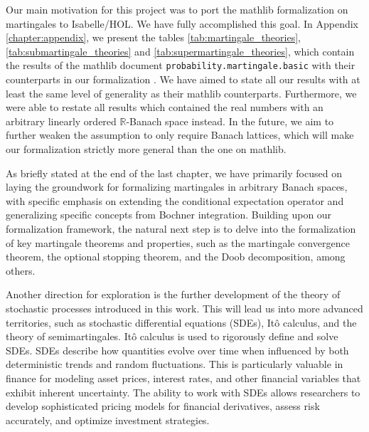 Our main motivation for this project was to port the \textsf{mathlib} formalization on martingales to Isabelle/HOL. We have fully accomplished this goal. In Appendix \ref{chapter:appendix}, we present the tables \ref{tab:martingale_theories}, \ref{tab:submartingale_theories} and \ref{tab:supermartingale_theories}, which contain the results of the \textsf{mathlib} document \texttt{probability.mar\-tingale.basic} \cite{Degenne_Ying_2022} with their counterparts in our formalization \cite{Keskin_A_Formalization_of_2023}. We have aimed to state all our results with at least the same level of generality as their \textsf{mathlib} counterparts. Furthermore, we were able to restate all results which contained the real numbers with an arbitrary linearly ordered $\mathbb{R}$-Banach space instead. In the future, we aim to further weaken the assumption to only require Banach lattices, which will make our formalization strictly more general than the one on \textsf{mathlib}.

As briefly stated at the end of the last chapter, we have primarily focused on laying the groundwork for formalizing martingales in arbitrary Banach spaces, with specific emphasis on extending the conditional expectation operator and generalizing specific concepts from Bochner integration. Building upon our formalization framework, the natural next step is to delve into the formalization of key martingale theorems and properties, such as the martingale convergence theorem, the optional stopping theorem, and the Doob decomposition, among others. 

Another direction for exploration is the further development of the theory of stochastic processes introduced in this work. This will lead us into more advanced territories, such as stochastic differential equations (SDEs), It\^o calculus, and the theory of semimartingales. It\^o calculus is used to rigorously define and solve SDEs. SDEs describe how quantities evolve over time when influenced by both deterministic trends and random fluctuations. This is particularly valuable in finance for modeling asset prices, interest rates, and other financial variables that exhibit inherent uncertainty. The ability to work with SDEs allows researchers to develop sophisticated pricing models for financial derivatives, assess risk accurately, and optimize investment strategies.

